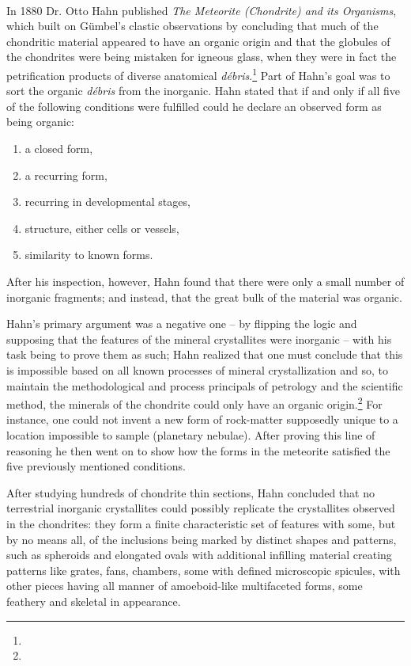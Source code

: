 \documentclass[a4paper, 12pt, oneside]{article}
\begin{document}
\paragraph*{}
In 1880 Dr. Otto Hahn published \emph{The Meteorite (Chondrite) and its Organisms}, which built on Gümbel's clastic observations by concluding that much of the chondritic material appeared to have an organic origin and that the globules of the chondrites were being mistaken for igneous glass, when they were in fact the petrification products of diverse anatomical \emph{débris}.\footnote{} Part of Hahn's goal was to sort the organic \emph{débris} from the inorganic. Hahn stated that if and only if all five of the following conditions were fulfilled could he declare an observed form as being organic:
\begin{enumerate}
    \item a closed form,
    \item a recurring form,
    \item recurring in developmental stages,
    \item structure, either cells or vessels,
    \item similarity to known forms.
\end{enumerate}
After his inspection, however, Hahn found that there were only a small number of inorganic fragments; and instead, that the great bulk of the material was organic.

Hahn's primary argument was a negative one -- by flipping the logic and supposing that the features of the mineral crystallites were inorganic -- with his task being to prove them as such; Hahn realized that one must conclude that this is impossible based on all known processes of mineral crystallization and so, to maintain the methodological and process principals of petrology and the scientific method, the minerals of the chondrite could only have an organic origin.\footnote{} For instance, one could not invent a new form of rock-matter supposedly unique to a location impossible to sample (planetary nebulae). After proving this line of reasoning he then went on to show how the forms in the meteorite satisfied the five previously mentioned conditions.

After studying hundreds of chondrite thin sections, Hahn concluded that no terrestrial inorganic crystallites could possibly replicate the crystallites observed in the chondrites: they form a finite characteristic set of features with some, but by no means all, of the inclusions being marked by distinct shapes and patterns, such as spheroids and elongated ovals with additional infilling material creating patterns like grates, fans, chambers, some with defined microscopic spicules, with other pieces having all manner of amoeboid-like multifaceted forms, some feathery and skeletal in appearance.
\end{document}

